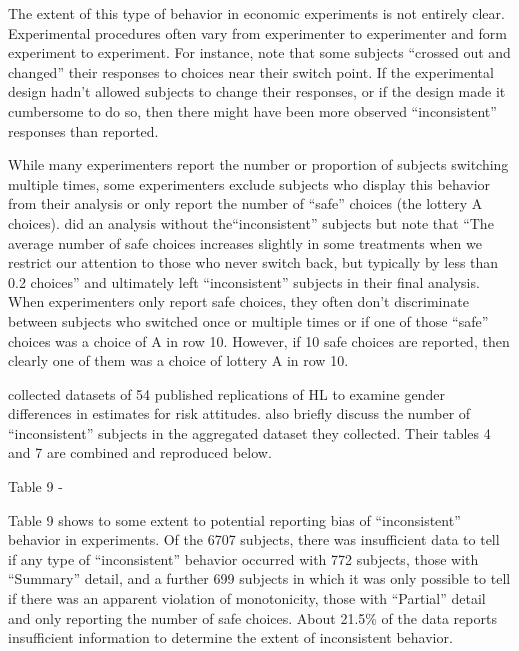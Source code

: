 The extent of this type of behavior in economic experiments is not entirely clear.
Experimental procedures often vary from experimenter to experimenter and form experiment to experiment.
For instance, \textcite{Holt2002} note that some subjects \enquote{crossed out and changed} their responses to choices near their switch point.
If the experimental design hadn't allowed subjects to change their responses, or if the design made it cumbersome to do so, then there might have been more observed \enquote{inconsistent} responses than reported. 

While many experimenters report the number or proportion of subjects switching multiple times, some experimenters exclude subjects who display this behavior from their analysis or only report the number of \enquote{safe} choices (the lottery A choices).
\textcite[1648]{Holt2002} did an analysis without the\enquote{inconsistent} subjects but note that \enquote{The average number of safe choices increases slightly in some treatments when we restrict our attention to those who never switch back, but typically by less than 0.2 choices} and ultimately left \enquote{inconsistent} subjects in their final analysis.
When experimenters only report safe choices, they often don't discriminate between subjects who switched once or multiple times or if one of those \enquote{safe} choices was a choice of A in row 10.
However, if 10 safe choices are reported, then clearly one of them was a choice of lottery A in row 10.

\textcite[9]{Filippin2014} collected datasets of 54 published replications of HL to examine gender differences in estimates for risk attitudes.
\textcite[10-11, 17-18]{Filippin2014} also briefly discuss the number of \enquote{inconsistent} subjects in the aggregated dataset they collected.
Their tables 4 and 7 are combined and reproduced below.

Table 9 - \textcite{Filippin2014}


Table 9 shows to some extent to potential reporting bias of \enquote{inconsistent} behavior in experiments.
Of the 6707 subjects, there was insufficient data to tell if any type of \enquote{inconsistent} behavior occurred with 772 subjects, those with \enquote{Summary} detail, and a further 699 subjects in which it was only possible to tell if there was an apparent violation of monotonicity, those with \enquote{Partial} detail and only reporting the number of safe choices.
About 21.5\% of the data reports insufficient information to determine the extent of inconsistent behavior.

